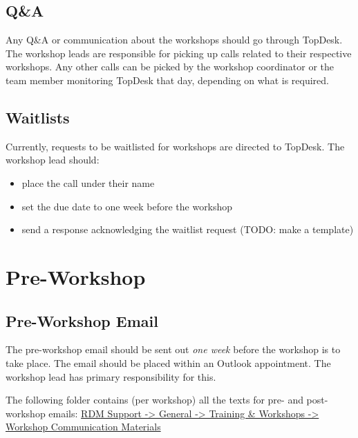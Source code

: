 \documentclass[
  letterpaper,
  DIV=11,
  numbers=noendperiod]{scrreprt}
\providecommand{\tightlist}{%
  \setlength{\itemsep}{0pt}\setlength{\parskip}{0pt}}\usepackage{longtable,booktabs,array}
\begin{document}

\subsection*{Q\&A}\label{qa}

Any Q\&A or communication about the workshops should go through TopDesk.
The workshop leads are responsible for picking up calls related to their
respective workshops. Any other calls can be picked by the workshop
coordinator or the team member monitoring TopDesk that day, depending on
what is required.

\subsection*{Waitlists}\label{waitlists}

Currently, requests to be waitlisted for workshops are directed to
TopDesk. The workshop lead should:

\begin{itemize}
\tightlist
\item
  place the call under their name
\item
  set the due date to one week before the workshop
\item
  send a response acknowledging the waitlist request (TODO: make a
  template)
\end{itemize}

\section*{Pre-Workshop}\label{pre-workshop}


\subsection*{Pre-Workshop Email}\label{pre-workshop-email}

The pre-workshop email should be sent out \emph{one week} before the
workshop is to take place. The email should be placed within an Outlook
appointment. The workshop lead has primary responsibility for this.

The following folder contains (per workshop) all the texts for pre- and
post-workshop emails:
\href{https://solisservices.sharepoint.com/:f:/r/sites/RDMSpeeltuin/Shared\%20Documents/General/Trainings\%20and\%20Workshops/Workshop\%20Communication\%20Materials?csf=1&web=1&e=dab1La}{RDM
Support -\textgreater{} General -\textgreater{} Training \& Workshops
-\textgreater{} Workshop Communication Materials}
\end{document}

